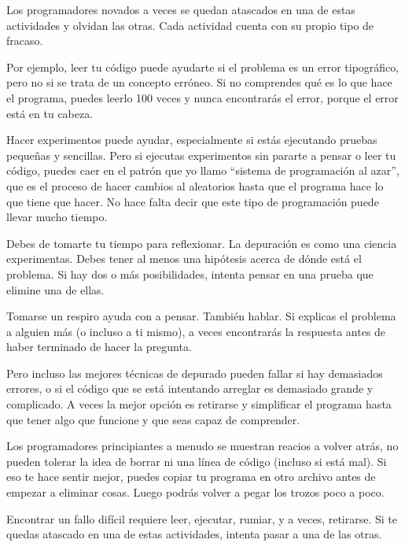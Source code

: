 Los programadores novados a veces se quedan atascados en una de estas actividades
y olvidan las otras. Cada actividad cuenta con su propio tipo
de fracaso.


Por ejemplo, leer tu código puede ayudarte si el problema es un
error tipográfico, pero no si se trata de un concepto
erróneo. Si no comprendes qué es lo que hace el programa, puedes
leerlo 100 veces y nunca encontrarás el error, porque el error está en
tu cabeza.


Hacer experimentos puede ayudar, especialmente si estás ejecutando
pruebas pequeñas y sencillas. Pero si ejecutas experimentos sin pararte a pensar
o leer tu código, puedes caer en el patrón que yo llamo ``sistema de programación al azar'',
que es el proceso de hacer cambios al aleatorios hasta que el programa
hace lo que tiene que hacer. No hace falta decir que este tipo de programación
puede llevar mucho tiempo.


Debes de tomarte tu tiempo para reflexionar. La depuración es como una
ciencia experimentas. Debes tener al menos una hipótesis acerca
de dónde está el problema. Si hay dos o más posibilidades, intenta
pensar en una prueba que elimine una de ellas.

Tomarse un respiro ayuda con a pensar. También hablar.
Si explicas el problema a alguien más (o incluso a ti mismo),
a veces encontrarás la respuesta antes de haber terminado de hacer la pregunta.

Pero incluso las mejores técnicas de depurado pueden fallar si hay demasiados
errores, o si el código que se está intentando arreglar es demasiado grande
y complicado. A veces la mejor opción es retirarse y simplificar el
programa hasta que tener algo que funcione y que seas
capaz de comprender.

Los programadores principiantes a menudo se muestran reacios a volver atrás,
no pueden tolerar la idea de borrar ni una línea de código (incluso si está mal).
Si eso te hace sentir mejor, puedes copiar tu programa en otro archivo
antes de empezar a eliminar cosas. Luego podrás volver a pegar los
trozos poco a poco.

Encontrar un fallo difícil requiere leer, ejecutar, rumiar, y
a veces, retirarse. Si te quedas atascado en una de estas actividades,
intenta pasar a una de las otras.



